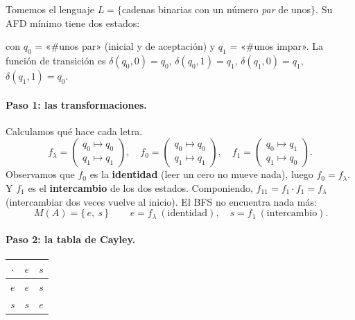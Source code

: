 \documentclass[11pt,a4paper]{article}
\theoremstyle{acc}
\newcommand{\code}[1]{{\ttfamily #1}}
\begin{document}
Tomemos el lenguaje $L=\{$cadenas binarias con un número \emph{par} de unos$\}$.
Su AFD mínimo tiene dos estados:

\begin{center}
\end{center}

\noindent con $q_0$ = «\#unos par» (inicial y de aceptación) y $q_1$ = «\#unos
impar». La función de transición es $\delta(q_0,0)=q_0$, $\delta(q_0,1)=q_1$,
$\delta(q_1,0)=q_1$, $\delta(q_1,1)=q_0$.

\paragraph{Paso 1: las transformaciones.} Calculamos qué hace cada letra.
\[
  f_\lambda=\begin{pmatrix}q_0\mapsto q_0\\ q_1\mapsto q_1\end{pmatrix}\!,\quad
  f_0=\begin{pmatrix}q_0\mapsto q_0\\ q_1\mapsto q_1\end{pmatrix}\!,\quad
  f_1=\begin{pmatrix}q_0\mapsto q_1\\ q_1\mapsto q_0\end{pmatrix}\!.
\]
Observamos que $f_0$ es la \textbf{identidad} (leer un cero no mueve nada), luego
$f_0=f_\lambda$. Y $f_1$ es el \textbf{intercambio} de los dos estados.
Componiendo, $f_{11}=f_1\cdot f_1=f_\lambda$ (intercambiar dos veces vuelve al
inicio). El BFS no encuentra nada más:
\[
  \boxed{\,M(A)=\{\, e,\ s \,\}\,}\qquad
  e=f_\lambda\ (\text{identidad}),\quad s=f_1\ (\text{intercambio}).
\]

\paragraph{Paso 2: la tabla de Cayley.}
\begin{center}
\renewcommand{\arraystretch}{1.3}
\begin{tabular}{c|cc}
$\cdot$ & $e$ & $s$ \\ \hline
$e$ & $e$ & $s$ \\
$s$ & $s$ & $e$ \\
\end{tabular}
\end{center}
\end{document}
